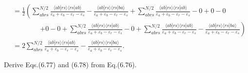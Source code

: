 \documentclass[a4paper]{book}
\newcounter{exercise}[chapter]
\newcounter{solution}[chapter]
\begin{document}
\begin{solution}
\begin{align*}
		&= \frac{1}{2} \left( \sum^{N/2}_{abrs} \frac{ \langle ab | rs \rangle \langle rs | ab \rangle  }{ \varepsilon_a + \varepsilon_b - \varepsilon_r - \varepsilon_s } - \frac{ \langle ab | rs \rangle\langle rs | ba \rangle }{ \varepsilon_a + \varepsilon_b - \varepsilon_r - \varepsilon_s } + \sum^{N/2}_{abrs} \frac{ \langle ab | rs \rangle \langle rs | ab \rangle  }{ \varepsilon_a + \varepsilon_b - \varepsilon_r - \varepsilon_s } - 0 + 0 - 0 \right. \\
		&\hspace{4em} \left. + 0 - 0 + \sum^{N/2}_{abrs} \frac{ \langle ab | rs \rangle \langle rs | ab \rangle  }{ \varepsilon_a + \varepsilon_b - \varepsilon_r - \varepsilon_s } - 0 + \sum^{N/2}_{abrs} \frac{ \langle ab | rs \rangle \langle rs | ab \rangle  }{ \varepsilon_a + \varepsilon_b - \varepsilon_r - \varepsilon_s } - \frac{ \langle ab | rs \rangle \langle rs | ba \rangle }{ \varepsilon_a + \varepsilon_b - \varepsilon_r - \varepsilon_s } \right) \\
		&= 2 \sum^{N/2}_{abrs} \frac{ \langle ab | rs \rangle \langle rs | ab \rangle  }{ \varepsilon_a + \varepsilon_b - \varepsilon_r - \varepsilon_s } - \frac{ \langle ab | rs \rangle\langle rs | ba \rangle }{ \varepsilon_a + \varepsilon_b - \varepsilon_r - \varepsilon_s }.
	\end{align*}
	
	\end{solution}
	
	\begin{exercise}
	Derive Eqs.(6.77) and (6.78) from Eq.(6.76).
	\end{exercise}
	
\end{document}
